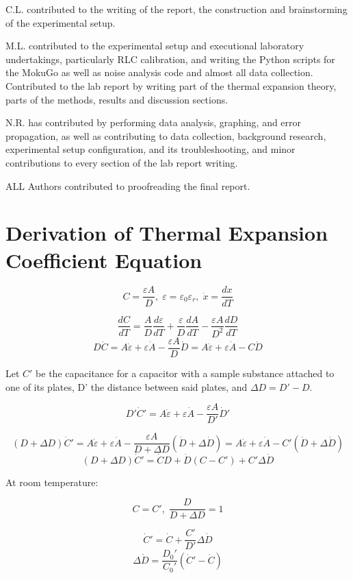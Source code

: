 \documentclass[letterpaper,12pt]{article}
\begin{document}
\noindent C.L. contributed to the writing of the report, the construction and brainstorming of the experimental setup. 

\noindent M.L. contributed to the experimental setup and executional laboratory undertakings, particularly RLC calibration, and writing the Python scripts for the MokuGo as well as noise analysis code and almost all data collection. Contributed to the lab report by writing part of the thermal expansion theory, parts of the methods, results and discussion sections.

\noindent N.R. has contributed by performing data analysis, graphing, and error propagation, as well as contributing to data collection, background research, experimental setup configuration, and its troubleshooting, and minor contributions to every section of the lab report writing.

\noindent ALL Authors contributed to proofreading the final report.
\clearpage
\appendix

\section{Derivation of Thermal Expansion Coefficient Equation}

\[
C=\frac{\varepsilon A}{D},\;\varepsilon =\varepsilon_0\varepsilon_r,\; \dot x=\frac{dx}{dT}
\]

 
\[
\frac{dC}{dT}=\frac{A}{D}\frac{d\varepsilon}{dT}+\frac{\varepsilon}{D}\frac{dA}{dT}-\frac{\varepsilon A}{D^2}\frac{dD}{dT}
\]
\[
D\dot C=A\dot \varepsilon+\varepsilon \dot A-\frac{\varepsilon A}{D}\dot D=A\dot \varepsilon+\varepsilon \dot A-C\dot D
\]

Let $C'$ be the capacitance for a capacitor with a sample substance attached to one of its plates, D' the distance between said plates, and $\Delta D = D' - D$. 

\[
D'\dot C'=A\dot \varepsilon+\varepsilon \dot A-\frac{\varepsilon A}{D'}\dot D'
\]

\[
(D+\Delta D)\dot C'=A\dot \varepsilon+\varepsilon \dot A-\frac{\varepsilon A}{D+\Delta D}(\dot D+\Delta \dot D)=A\dot \varepsilon+\varepsilon \dot A-C'(\dot D+\Delta \dot D)
\]
\[
(D+\Delta D)\dot C'=\dot CD+\dot D(C-C')+C'\Delta \dot D
\]

At room temperature:

\[
C=C',\;\frac{D}{D+\Delta D}=1
\]

\[
\dot C'=\dot C+\frac{C'}{D'}\Delta \dot D
\]
\[
\Delta \dot D=\frac{D_0'}{C_0'}(\dot C'-\dot C)
\]
\end{document}
